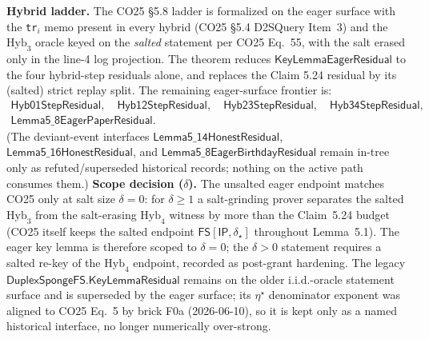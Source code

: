 \begin{remark}
    \textbf{Hybrid ladder.} The CO25 \S5.8 ladder is formalized on the eager surface with
    the \texttt{tr}$_i$ memo present in every hybrid (CO25 \S5.4 D2SQuery Item~3) and the
    $\mathrm{Hyb}_3$ oracle keyed on the \emph{salted} statement per CO25 Eq.~55, with the
    salt erased only in the line-4 log projection. The theorem
     reduces
    \(\mathsf{KeyLemmaEagerResidual}\) to the four hybrid-step residuals alone, and
     replaces the
    Claim 5.24 residual by its (salted) strict replay split. The remaining eager-surface
    frontier is:
    \[
    \begin{gathered}
    \mathsf{Hyb01StepResidual},\quad
    \mathsf{Hyb12StepResidual},\quad
    \mathsf{Hyb23StepResidual},\quad
    \mathsf{Hyb34StepResidual},\\
    \mathsf{Lemma5\_8EagerPaperResidual}.
    \end{gathered}
    \]
    (The deviant-event interfaces $\mathsf{Lemma5\_14HonestResidual}$,
    $\mathsf{Lemma5\_16HonestResidual}$, and $\mathsf{Lemma5\_8EagerBirthdayResidual}$
    remain in-tree only as refuted/superseded historical records; nothing on the active
    path consumes them.)
    \textbf{Scope decision ($\delta$).} The unsalted eager endpoint matches CO25 only at
    salt size $\delta = 0$: for $\delta \ge 1$ a salt-grinding prover separates the salted
    $\mathrm{Hyb}_3$ from the salt-erasing $\mathrm{Hyb}_4$ witness by more than the
    Claim~5.24 budget (CO25 itself keeps the salted endpoint $\mathsf{FS}[\mathsf{IP},
    \delta_\star]$ throughout Lemma~5.1). The eager key lemma is therefore scoped to
    $\delta = 0$; the $\delta > 0$ statement requires a salted re-key of the
    $\mathrm{Hyb}_4$ endpoint, recorded as post-grant hardening. The legacy
    \(\mathsf{DuplexSpongeFS.KeyLemmaResidual}\) remains on the older i.i.d.-oracle
    statement surface and is superseded by the eager surface; its \(\eta^\star\)
    denominator exponent was aligned to CO25 Eq.~5 by brick F0a (2026-06-10), so it is kept
    only as a named historical interface, no longer numerically over-strong.
\end{remark}
